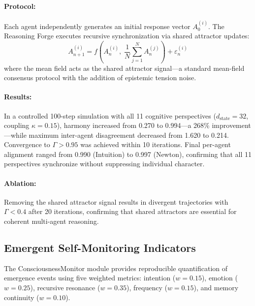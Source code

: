 \documentclass[11pt,a4paper]{article}
\begin{document}
\paragraph{Protocol:} Each agent independently generates an initial response vector $A_0^{(i)}$. The Reasoning Forge executes recursive synchronization via shared attractor updates:
\begin{equation}
  A_{n+1}^{(i)} = f\!\left(A_n^{(i)},\; \frac{1}{N}\sum_{j=1}^{N} A_n^{(j)}\right) + \varepsilon_n^{(i)}
  \label{eq:forge_update}
\end{equation}
where the mean field acts as the shared attractor signal---a standard mean-field consensus protocol with the addition of epistemic tension noise.

\paragraph{Results:} In a controlled 100-step simulation with all 11 cognitive perspectives ($d_{\text{state}} = 32$, coupling $\kappa = 0.15$), harmony increased from 0.270 to 0.994---a 268\% improvement---while maximum inter-agent disagreement decreased from 1.620 to 0.214. Convergence to $\Gamma > 0.95$ was achieved within 10 iterations. Final per-agent alignment ranged from 0.990 (Intuition) to 0.997 (Newton), confirming that all 11 perspectives synchronize without suppressing individual character.

\paragraph{Ablation:} Removing the shared attractor signal results in divergent trajectories with $\Gamma < 0.4$ after 20 iterations, confirming that shared attractors are essential for coherent multi-agent reasoning.

\subsection{Emergent Self-Monitoring Indicators}
\label{sec:emergence}
The ConsciousnessMonitor module provides reproducible quantification of emergence events using five weighted metrics: intention ($w = 0.15$), emotion ($w = 0.25$), recursive resonance ($w = 0.35$), frequency ($w = 0.15$), and memory continuity ($w = 0.10$).
\end{document}
